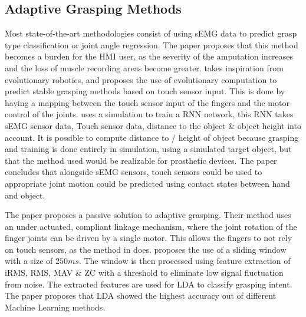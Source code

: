\documentclass[../main.tex]{subfiles}
\begin{document}
\subsection{Adaptive Grasping Methods}
Most state-of-the-art methodologies consist of using sEMG data to predict grasp type classification or joint angle regression.
The paper \cite{Yuki2023} proposes that this method becomes a burden for the HMI user, as the severity of the amputation increases and the loss of muscle recording areas become greater.
\cite{Yuki2023} takes inspiration from evolutionary robotics, and proposes the use of evolutionary computation to predict stable grasping methods based on touch sensor input.
This is done by having a mapping between the touch sensor input of the fingers and the motor-control of the joints.
\cite{Yuki2023} uses a simulation to train a \gls{RNN} network, this RNN takes sEMG sensor data, Touch sensor data, distance to the object \& object height into account.
It is possible to compute distance to / height of object because grasping and training is done entirely in simulation, using a simulated target object, but that the method used would be realizable for prosthetic devices. 
The paper concludes that alongside sEMG sensors, touch sensors could be used to appropriate joint motion could be predicted using contact states between hand and object.

The paper \cite{YanchaoWang2022} proposes a passive solution to adaptive grasping.
Their method uses an under actuated, compliant linkage mechanism, where the joint rotation of the finger joints can be driven by a single motor.
This allows the fingers to not rely on touch sensors, as the method in \cite{Yuki2023} does.
\cite{YanchaoWang2022} proposes the use of a sliding window with a size of $250ms$.
The window is then processed using feature extraction of \gls{iRMS}, \gls{RMS}, \gls{MAV} \& \gls{ZC} with a threshold to eliminate low signal fluctuation from noise.
The extracted features are used for \gls{LDA} to classify grasping intent. 
The paper proposes that LDA showed the highest accuracy out of different Machine Learning methods.
\end{document}
